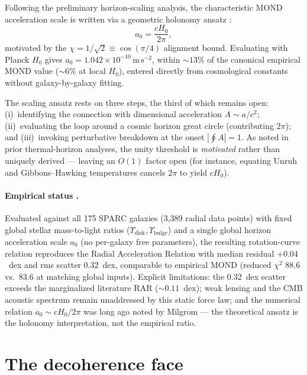 \documentclass{alienfolio}
\begin{document}
Following the preliminary horizon-scaling analysis, the characteristic
MOND acceleration scale is written via a geometric holonomy ansatz
:
\begin{equation}
a_0 = \frac{cH_0}{2\pi},
\end{equation}
motivated by the $\chi = 1/\sqrt{2} \equiv \cos(\pi/4)$ alignment bound.
Evaluating with Planck $H_0$ gives $a_0 = 1.042 \times
10^{-10}\,\mathrm{m\,s^{-2}}$, within $\sim 13\%$ of the canonical
empirical MOND value ($\sim 6\%$ at local $H_0$), entered directly from
cosmological constants without galaxy-by-galaxy fitting.

The scaling ansatz rests on three steps, the third of which remains
open: (i)~identifying the connection with dimensional acceleration
$A \sim a/c^2$; (ii)~evaluating the loop around a cosmic horizon great
circle (contributing $2\pi$); and (iii)~invoking perturbative breakdown at
the onset $|\oint A| = 1$. As noted in prior thermal-horizon analyses,
the unity threshold is \emph{motivated} rather than uniquely derived ---
leaving an $O(1)$ factor open (for instance, equating Unruh and
Gibbons--Hawking temperatures cancels $2\pi$ to yield $cH_0$).

\paragraph{Empirical status .} Evaluated against all
175 SPARC galaxies \cite{lelli16} (3,389 radial data points) with fixed
global stellar mass-to-light ratios ($\Upsilon_{\mathrm{disk}},
\Upsilon_{\mathrm{bulge}}$) and a single global horizon acceleration
scale $a_0$ (no per-galaxy free parameters), the resulting rotation-curve
relation reproduces the Radial Acceleration Relation with median
residual $+0.04$~dex and rms scatter $0.32$~dex, comparable to empirical
MOND (reduced $\chi^2$ $88.6$ vs.\ $83.6$ at matching global inputs).
Explicit limitations: the $0.32$~dex scatter exceeds the marginalized
literature RAR ($\sim 0.11$~dex); weak lensing and the CMB acoustic
spectrum remain unaddressed by this static force law; and the numerical
relation $a_0 \sim cH_0/2\pi$ was long ago noted by Milgrom
\cite{milgrom83,milgrom99} --- the theoretical ansatz is the holonomy
interpretation, not the empirical ratio.

\section{The decoherence face}
\label{sec:decoherence}
\end{document}

